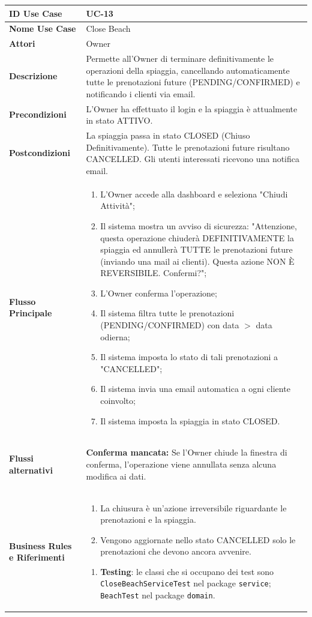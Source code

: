 \documentclass{article}
\newcommand{\usecasetable}[9]{
	\begin{table}[h!]
		\centering
		\footnotesize
		\renewcommand{\arraystretch}{1.4}
		\begin{tabularx}{\textwidth}{|l|>{\raggedright\arraybackslash}X|}
			\hline
			\textbf{ID Use Case} & #1 \\ \hline
			\textbf{Nome Use Case} & #2 \\ \hline
			\textbf{Attori} & #3 \\ \hline
			\textbf{Descrizione} & #4 \\ \hline
			\textbf{Precondizioni} & #5 \\ \hline
			\textbf{Postcondizioni} & #6 \\ \hline
			\textbf{Flusso Principale} & #7 \\ \hline
			\textbf{Flussi alternativi} & #8 \\ \hline
			\textbf{Business Rules e Riferimenti} & #9 \\ \hline
		\end{tabularx}
	\end{table}
}
\begin{document}
	\usecasetable
	{UC-13}
	{Close Beach}
	{Owner}
	{Permette all'Owner di terminare definitivamente le operazioni della spiaggia, cancellando automaticamente tutte le prenotazioni future (PENDING/CONFIRMED) e notificando i clienti via email.}
	{L'Owner ha effettuato il login e la spiaggia è attualmente in stato ATTIVO.}
	{La spiaggia passa in stato CLOSED (Chiuso Definitivamente). Tutte le prenotazioni future risultano CANCELLED. Gli utenti interessati ricevono una notifica email.}
	{
		\begin{enumerate}[nosep, leftmargin=*]
			\item L'Owner accede alla dashboard e seleziona "Chiudi Attività";
			\item Il sistema mostra un avviso di sicurezza: "Attenzione, questa operazione chiuderà DEFINITIVAMENTE la spiaggia ed annullerà TUTTE le prenotazioni future (inviando una mail ai clienti). Questa azione NON È REVERSIBILE. Confermi?";
			\item L'Owner conferma l'operazione;
			\item Il sistema filtra tutte le prenotazioni (PENDING/CONFIRMED) con data $>$ data odierna;
			\item Il sistema imposta lo stato di tali prenotazioni a "CANCELLED";
			\item Il sistema invia una email automatica a ogni cliente coinvolto;
			\item Il sistema imposta la spiaggia in stato CLOSED.
		\end{enumerate}
	}
	{
		\begin{description}[nosep, leftmargin=25px]
			\item[\textbf{3a-e.}] \textbf{Conferma mancata:} Se l'Owner chiude la finestra di conferma, l'operazione viene annullata senza alcuna modifica ai dati.
		\end{description}
	}
	{
		\begin{enumerate}[nosep, leftmargin=*]
			\item[•] La chiusura è un'azione irreversibile riguardante le prenotazioni e la spiaggia. 
			\item[•] Vengono aggiornate nello stato CANCELLED solo le prenotazioni che devono ancora avvenire.
		\end{enumerate}
		
		\begin{enumerate}[leftmargin=*]
			\item[•] \textbf{Testing}: le classi che si occupano dei test sono \texttt{CloseBeachServiceTest} nel package \texttt{service}; \texttt{BeachTest} nel package \texttt{domain}.
		\end{enumerate}
	}
		
\end{document}
